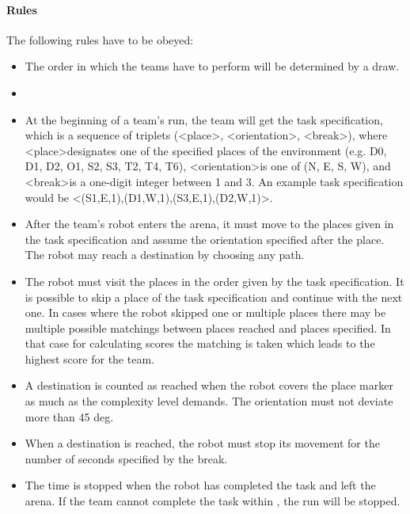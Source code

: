 \paragraph{Rules}
The following rules have to be obeyed:

\begin{itemize}
\item The order in which the teams have to perform will be determined by a draw.
\item {} 
\item At the beginning of a team’s run, the team will get the task specification, which is a sequence of triplets (\textless place\textgreater, \textless orientation\textgreater, \textless break\textgreater), where \textless place\textgreater designates one of the specified places of the environment (e.g. D0, D1, D2, O1, S2, S3, T2, T4, T6), \textless orientation\textgreater is one of (N, E, S, W), and \textless break\textgreater is a one-digit integer between 1 and 3. An example task specification would be \textless (S1,E,1),(D1,W,1),(S3,E,1),(D2,W,1)\textgreater .
\item After the team’s robot enters the arena, it must move to the places given in the task specification and assume the orientation specified after the place. The robot may reach a destination by choosing any path.
\item The robot must visit the places in the order given by the task specification. It is possible to skip a place of the task specification and continue with the next one. In cases where the robot skipped one or multiple places there may be multiple possible matchings between places reached and places specified. In that case for calculating scores the matching is taken which leads to the highest score for the team.
\item A destination is counted as reached when the robot covers the place marker as much as the complexity level demands. The orientation must not deviate more than 45 deg.
\item When a destination is reached, the robot must stop its movement for the number of seconds specified by the break.
\item The time is stopped when the robot has completed the task and left the arena. If the team cannot complete the task within , the run will be stopped.
\end{itemize}
